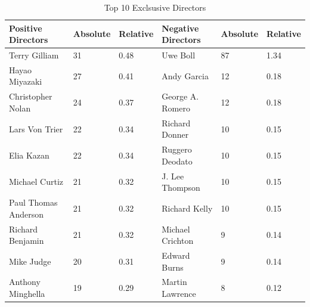 \documentclass[
10pt, %
a4paper, %
oneside, %
headinclude,footinclude, %
] {book}%
\begin{document}
\begin{table}[]
\centering
\caption{Top 10 Exclsusive Directors}
\label{Table 9}
\begin{tabular}{llllll}
\toprule
Positive Directors   & Absolute & Relative & Negative Directors & Absolute & Relative \\ \midrule
Terry Gilliam        & 31       & 0.48     & Uwe Boll           & 87       & 1.34     \\
Hayao Miyazaki       & 27       & 0.41     & Andy Garcia        & 12       & 0.18     \\
Christopher Nolan    & 24       & 0.37     & George A. Romero   & 12       & 0.18     \\
Lars Von Trier       & 22       & 0.34     & Richard Donner     & 10       & 0.15     \\
Elia Kazan           & 22       & 0.34     & Ruggero Deodato    & 10       & 0.15     \\
Michael Curtiz       & 21       & 0.32     & J. Lee Thompson    & 10       & 0.15     \\
Paul Thomas Anderson & 21       & 0.32     & Richard Kelly      & 10       & 0.15     \\
Richard Benjamin     & 21       & 0.32     & Michael Crichton   & 9        & 0.14     \\
Mike Judge           & 20       & 0.31     & Edward Burns       & 9        & 0.14     \\
Anthony Minghella    & 19       & 0.29     & Martin Lawrence    & 8        & 0.12    \\ \bottomrule
\end{tabular}
\end{table}
\end{document}
